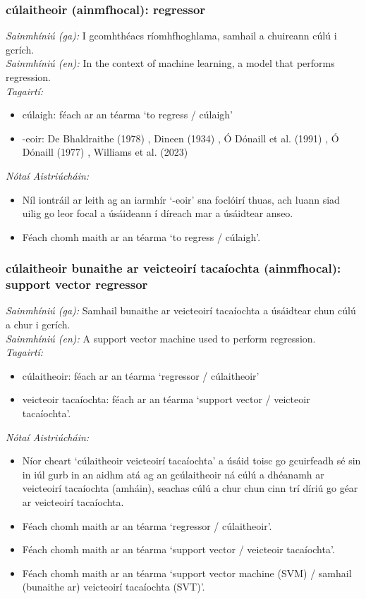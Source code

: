 \subsubsection*{cúlaitheoir (ainmfhocal): regressor}
 \noindent \textit{Sainmhíniú (ga):} I gcomhthéacs ríomhfhoghlama, samhail a chuireann cúlú i gcrích.
\\
 \noindent \textit{Sainmhíniú (en):} In the context of machine learning, a model that performs regression.
\\
 \noindent \textit{Tagairtí:}
\begin{itemize}
	\item cúlaigh: féach ar an téarma `to regress / cúlaigh'
	\item -eoir: De Bhaldraithe (1978) \cite{de-bhaldraithe}, Dineen (1934) \cite{dineen}, Ó Dónaill et al. (1991) \cite{focloir-beag}, Ó Dónaill (1977) \cite{odonaill}, Williams et al. (2023) \cite{storchiste}
\end{itemize}

 \noindent \textit{Nótaí Aistriúcháin:}
\begin{itemize}
	\item Níl iontráil ar leith ag an iarmhír `-eoir' sna foclóirí thuas, ach luann siad uilig go leor focal a úsáideann í díreach mar a úsáidtear anseo.
	\item Féach chomh maith ar an téarma `to regress / cúlaigh'.
\end{itemize}


\subsubsection*{cúlaitheoir bunaithe ar veicteoirí tacaíochta (ainmfhocal): support vector regressor}
 \noindent \textit{Sainmhíniú (ga):} Samhail bunaithe ar veicteoirí tacaíochta a úsáidtear chun cúlú a chur i gcrích.
\\
 \noindent \textit{Sainmhíniú (en):} A support vector machine used to perform regression.
\\
 \noindent \textit{Tagairtí:}
\begin{itemize}
	\item cúlaitheoir: féach ar an téarma `regressor / cúlaitheoir'
	\item veicteoir tacaíochta: féach ar an téarma `support vector / veicteoir tacaíochta'.
\end{itemize}

 \noindent \textit{Nótaí Aistriúcháin:}
\begin{itemize}
	\item Níor cheart `cúlaitheoir veicteoirí tacaíochta' a úsáid toisc go gcuirfeadh sé sin in iúl gurb in an aidhm atá ag an gcúlaitheoir ná cúlú a dhéanamh ar veicteoirí tacaíochta (amháin), seachas cúlú a chur chun cinn trí díriú go géar ar veicteoirí tacaíochta.
	\item Féach chomh maith ar an téarma `regressor / cúlaitheoir'.
	\item Féach chomh maith ar an téarma `support vector / veicteoir tacaíochta'.
	\item Féach chomh maith ar an téarma `support vector machine (SVM) / samhail (bunaithe ar) veicteoirí tacaíochta (SVT)'.
\end{itemize}


